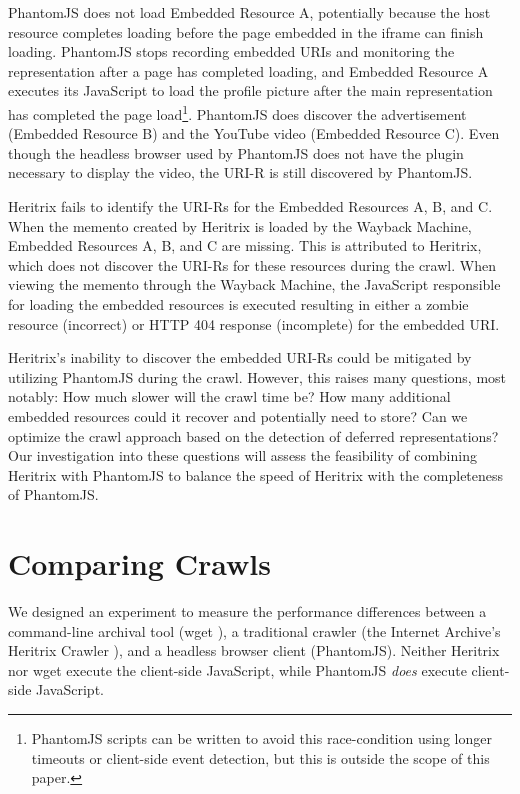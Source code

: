 \documentclass{ipres_proc_article-sp}
\begin{document}
PhantomJS does not load Embedded Resource A, potentially because the host resource completes loading before the page embedded in the iframe can finish loading. PhantomJS stops recording embedded URIs and monitoring the representation after a page has completed loading, and Embedded Resource A executes its JavaScript to load the profile picture after the main representation has completed the page load\footnote{PhantomJS scripts can be written to avoid this race-condition using longer timeouts or client-side event detection, but this is outside the scope of this paper.}.
 PhantomJS does discover the advertisement (Embedded Resource B) and the YouTube video (Embedded Resource C). Even though the headless browser used by PhantomJS does not have the plugin necessary to display the video, the URI-R is still discovered by PhantomJS.

Heritrix fails to identify the URI-Rs for the Embedded Resources A, B, and C. When the memento created by Heritrix is loaded by the Wayback Machine, Embedded Resources A, B, and C are missing. This is attributed to Heritrix, which does not discover the URI-Rs for these resources during the crawl. When viewing the memento through the Wayback Machine, the JavaScript responsible for loading the embedded resources is executed resulting in either a zombie resource \cite{zombies} (incorrect) or HTTP 404 response (incomplete) for the embedded URI.

Heritrix's inability to discover the embedded URI-Rs could be mitigated by utilizing PhantomJS during the crawl. However, this raises many questions, most notably: How much slower will the crawl time be? How many additional embedded resources could it recover and potentially need to store? Can we optimize the crawl approach based on the detection of deferred representations? Our investigation into these questions will assess the feasibility of combining Heritrix with PhantomJS to balance the speed of Heritrix with the completeness of PhantomJS.


\section{Comparing Crawls}
\label{performance}
We designed an experiment to measure the performance differences between a command-line archival tool (wget \cite{wget}), a traditional crawler (the Internet Archive's Heritrix Crawler \cite{heritrix, Sigurosson:Incremental-Heritrix}), and a headless browser client (PhantomJS). Neither Heritrix nor wget execute the client-side JavaScript, while PhantomJS \emph{does} execute client-side JavaScript.
\end{document}
